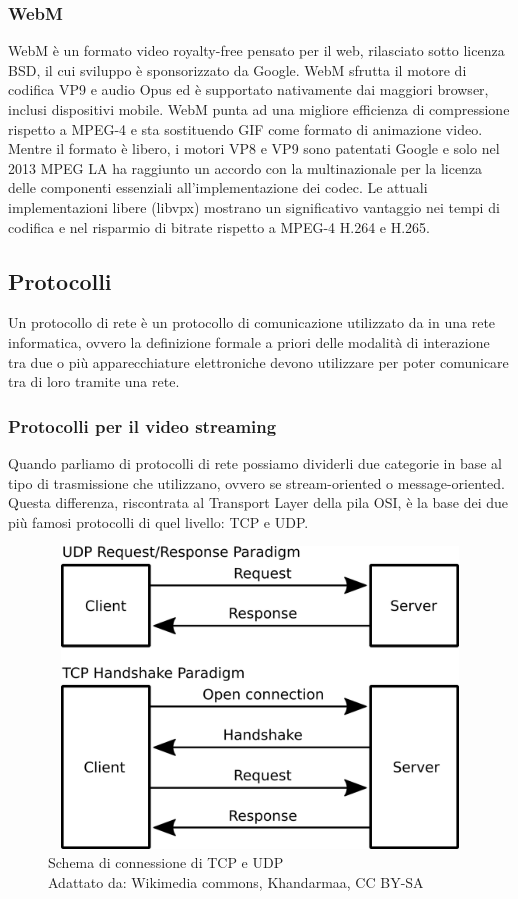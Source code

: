 		\subsubsection{WebM}
			WebM è un formato video royalty-free pensato per il web, rilasciato sotto licenza \gls{BSD}, il cui sviluppo è sponsorizzato da Google. WebM sfrutta il motore di codifica VP9 e audio Opus ed è supportato nativamente dai maggiori browser, inclusi dispositivi mobile. WebM punta ad una migliore efficienza di compressione rispetto a MPEG-4 e sta sostituendo \gls{GIF} come formato di animazione video. Mentre il formato è libero, i motori VP8 e VP9 sono patentati Google e solo nel 2013 \gls{MPEG} LA ha raggiunto un accordo con la multinazionale per la licenza delle componenti essenziali all'implementazione dei codec. Le attuali implementazioni libere (libvpx) mostrano un significativo vantaggio nei tempi di codifica e nel risparmio di bitrate rispetto a MPEG-4 H.264 e H.265.
	\subsection{Protocolli}
	Un protocollo di rete è un protocollo di comunicazione utilizzato da in una rete informatica, ovvero la definizione formale a priori delle modalità di interazione tra due o più apparecchiature elettroniche devono utilizzare per poter comunicare tra di loro tramite una rete.

		\subsubsection{Protocolli per il video streaming}
			Quando parliamo di protocolli di rete possiamo dividerli due categorie in base al tipo di trasmissione che utilizzano, ovvero se stream-oriented o message-oriented. Questa differenza, riscontrata al Transport Layer della pila \gls{OSI}, è la base dei due più famosi protocolli di quel livello: \gls{TCP} e \gls{UDP}.\@
			\begin{figure}[H]
				\begin{center}
					\includegraphics[width=16.5cm,height=8cm,keepaspectratio]{immagini/tcp-udp-connections}	
					\caption[Schema di connessione di TCP e UDP]{Schema di connessione di \gls{TCP} e \gls{UDP}
					\\
					Adattato da: Wikimedia commons, Khandarmaa, CC BY-SA}
				\end{center}
			\end{figure}
